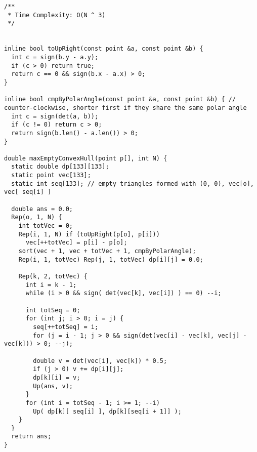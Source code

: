\begin{lstlisting}
/**
 * Time Complexity: O(N ^ 3)
 */


inline bool toUpRight(const point &a, const point &b) {
  int c = sign(b.y - a.y);
  if (c > 0) return true;
  return c == 0 && sign(b.x - a.x) > 0;
}

inline bool cmpByPolarAngle(const point &a, const point &b) { // counter-clockwise, shorter first if they share the same polar angle
  int c = sign(det(a, b));
  if (c != 0) return c > 0;
  return sign(b.len() - a.len()) > 0;
}

double maxEmptyConvexHull(point p[], int N) {
  static double dp[133][133];
  static point vec[133];
  static int seq[133]; // empty triangles formed with (0, 0), vec[o], vec[ seq[i] ]

  double ans = 0.0;
  Rep(o, 1, N) {
    int totVec = 0;
    Rep(i, 1, N) if (toUpRight(p[o], p[i])) 
      vec[++totVec] = p[i] - p[o];
    sort(vec + 1, vec + totVec + 1, cmpByPolarAngle);
    Rep(i, 1, totVec) Rep(j, 1, totVec) dp[i][j] = 0.0;
    
    Rep(k, 2, totVec) {
      int i = k - 1;
      while (i > 0 && sign( det(vec[k], vec[i]) ) == 0) --i;
      
      int totSeq = 0;
      for (int j; i > 0; i = j) {
        seq[++totSeq] = i;
        for (j = i - 1; j > 0 && sign(det(vec[i] - vec[k], vec[j] - vec[k])) > 0; --j);

        double v = det(vec[i], vec[k]) * 0.5;
        if (j > 0) v += dp[i][j];
        dp[k][i] = v;
        Up(ans, v);
      }
      for (int i = totSeq - 1; i >= 1; --i)
        Up( dp[k][ seq[i] ], dp[k][seq[i + 1]] );
    }
  }
  return ans;
}

\end{lstlisting}